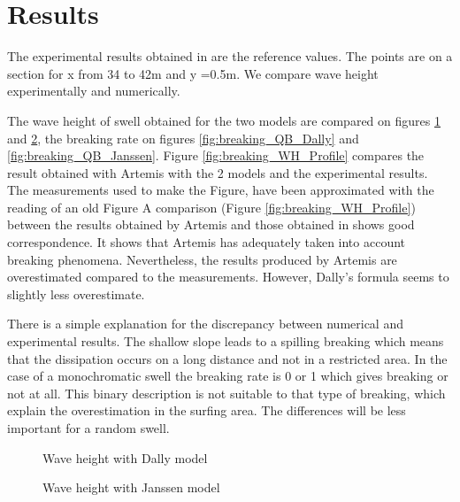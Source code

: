 \section{Results}
The experimental results obtained in \cite{Stive1984} are the reference values.
The points are on a section for x from 34 to 42m and y =0.5m. We compare wave height experimentally and
numerically.

The wave height of swell obtained for the two models are compared on figures
\ref{fig:breaking_WH_Dally} and \ref{fig:breaking_WH_Janssen}, the breaking
rate on figures \ref{fig:breaking_QB_Dally} and \ref{fig:breaking_QB_Janssen}.
Figure \ref{fig:breaking_WH_Profile} compares the result obtained with Artemis
with the 2 models and the experimental results. The measurements used to make
the Figure, have been approximated with the reading of an old Figure
A comparison (Figure \ref{fig:breaking_WH_Profile}) between the results
obtained by Artemis and those obtained in \cite{} shows good correspondence.
It shows that Artemis has adequately taken into account breaking phenomena.
Nevertheless, the results produced by
Artemis are overestimated compared to the measurements. However, Dally's
formula seems to slightly less overestimate.

There is a simple explanation for the discrepancy between numerical and
experimental results. The shallow slope leads to a spilling breaking which
means that the dissipation occurs on a long distance and not in a restricted
area. In the case of a monochromatic swell the breaking rate is 0 or 1 which
gives breaking or not at all. This binary description is not suitable to that
type of breaking, which explain the overestimation in the surfing area. The
differences will be less important for a random swell.  

\begin{figure}[h]
\begin{center}
\end{center}
\caption{Wave height with Dally model}
\label{fig:breaking_WH_Dally}
\end{figure}

\begin{figure}[h]
\begin{center}
\end{center}
\caption{Wave height with Janssen model}
\label{fig:breaking_WH_Janssen}
\end{figure}

